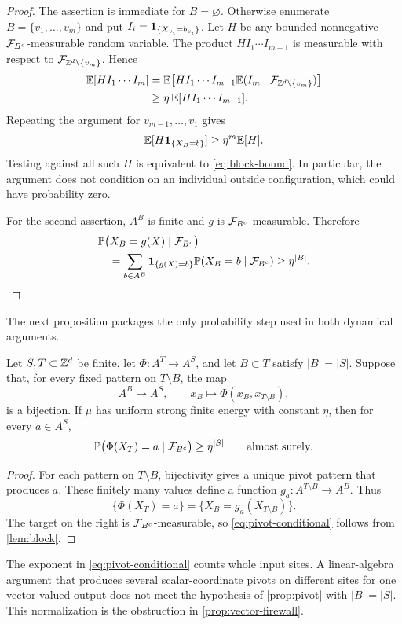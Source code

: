 \begin{proof}
The assertion is immediate for $B=\varnothing$.  Otherwise enumerate
$B=\{v_1,\ldots,v_m\}$ and put
$I_i=\mathbf{1}_{\{X_{v_i}=b_{v_i}\}}$.  Let $H$ be any bounded nonnegative
$\mathcal{F}_{B^c}$-measurable random variable.  The product
$H I_1\cdots I_{m-1}$ is measurable with respect to
$\mathcal{F}_{\mathbb{Z}^d\setminus\{v_m\}}$.  Hence
\begin{align*}
 \mathbb{E}[H I_1\cdots I_m]
 &=\mathbb{E}\!\left[
   H I_1\cdots I_{m-1}
   \mathbb{E}(I_m\mid\mathcal{F}_{\mathbb{Z}^d\setminus\{v_m\}})
 \right]\\
 &\geq \eta\,\mathbb{E}[H I_1\cdots I_{m-1}].
\end{align*}
Repeating the argument for $v_{m-1},\ldots,v_1$ gives
\[
  \mathbb{E}[H\mathbf{1}_{\{X_B=b\}}]\geq\eta^m\mathbb{E}[H].
\]
Testing against all such $H$ is equivalent to \eqref{eq:block-bound}.  In
particular, the argument does not condition on an individual outside
configuration, which could have probability zero.

For the second assertion, $A^B$ is finite and $g$ is
$\mathcal{F}_{B^c}$-measurable.  Therefore
\begin{align*}
 &\mathbb{P}\bigl(X_B=g(X)\mid\mathcal{F}_{B^c}\bigr)\\
 &\quad=\sum_{b\in A^B}
   \mathbf{1}_{\{g(X)=b\}}\mathbb{P}(X_B=b\mid\mathcal{F}_{B^c})
 \geq \eta^{|B|}.
\end{align*}
\end{proof}

The next proposition packages the only probability step used in both
dynamical arguments.

\begin{proposition}\label{prop:pivot}
Let $S,T\subset\mathbb{Z}^d$ be finite, let
$\Phi\colon A^T\to A^S$, and let $B\subset T$ satisfy $|B|=|S|$.  Suppose
that, for every fixed pattern on $T\setminus B$, the map
\[
  A^B\longrightarrow A^S,\qquad
  x_B\longmapsto\Phi(x_B,x_{T\setminus B}),
\]
is a bijection.  If $\mu$ has uniform strong finite energy with constant
$\eta$, then for every $a\in A^S$,
\begin{equation}\label{eq:pivot-conditional}
  \mathbb{P}\bigl(\Phi(X_T)=a\mid\mathcal{F}_{B^c}\bigr)
  \geq\eta^{|S|}
  \qquad\text{almost surely}.
\end{equation}
\end{proposition}

\begin{proof}
For each pattern on $T\setminus B$, bijectivity gives a unique pivot pattern
that produces $a$.  These finitely many values define a function
$g_a\colon A^{T\setminus B}\to A^B$.  Thus
\[
   \{\Phi(X_T)=a\}=\{X_B=g_a(X_{T\setminus B})\}.
\]
The target on the right is $\mathcal{F}_{B^c}$-measurable, so
\eqref{eq:pivot-conditional} follows from
\cref{lem:block}.
\end{proof}

\begin{remark}\label{rem:pivot-normalization}
The exponent in \eqref{eq:pivot-conditional} counts whole input sites.  A
linear-algebra argument that produces several scalar-coordinate pivots on
different sites for one vector-valued output does not meet the hypothesis of
\cref{prop:pivot} with $|B|=|S|$.  This normalization is the obstruction in
\cref{prop:vector-firewall}.
\end{remark}

